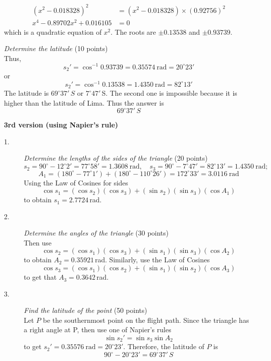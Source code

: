 \begin{description}
\begin{align*}
  (x^2 - 0.018328)^2 &= (x^2 - 0.018328) \times (0.92756)^2\\
  x^4 - 0.89702x^2 + 0.016105 &= 0
  \end{align*}
  which is a quadratic equation of $x^2$. The roots are $\pm 0.13538$ and
  $\pm 0.93739$.
\item[5.] \emph{Determine the latitude} \hfill(10 points)\\
  Thus,
  \[ s_2' = \cos^{-1} 0.93739 = 0.35574\ \mathrm{rad} = 20^\circ 23' \]
  or
  \[ s_2' = \cos^{-1} 0.13538 = 1.4350\ \mathrm{rad} = 82^\circ 13' \]
  The latitude is $69^\circ 37'\,S$ or $7^\circ 47'$\,S. The second one is
  impossible because it is higher than the latitude of Lima. Thus the answer
  is
  \[ 69^\circ 37'\,S \]
\end{description}

\textbf{3rd version (using Napier's rule)}

\begin{description}
\item[1.] \emph{Determine the lengths of the sides of the triangle}
  \hfill(20 points)\\
  \[ s_2 = 90^\circ - 12^\circ 2' = 77^\circ 58' = 1.3608\ \mathrm{rad},\quad
     s_3 = 90^\circ - 7^\circ 47' = 82^\circ 13' = 1.4350\ \mathrm{rad}; \]
  \[ A_1 = (180^\circ - 77^\circ 1') + (180^\circ - 110^\circ 26')
     = 172^\circ 33' = 3.0116\ \mathrm{rad} \]
  Using the Law of Cosines for sides
  \[ \cos s_1 = (\cos s_2)(\cos s_3) + (\sin s_2)(\sin s_3)(\cos A_1) \]
  to obtain $s_1 = 2.7724$\,rad.
\item[2.] \emph{Determine the angles of the triangle} \hfill(30 points)\\
  Then use
  \[ \cos s_2 = (\cos s_1)(\cos s_3) + (\sin s_1)(\sin s_3)(\cos A_2) \]
  to obtain $A_2 = 0.35921$\,rad. Similarly, use the Law of Cosines
  \[ \cos s_3 = (\cos s_1)(\cos s_2) + (\sin s_1)(\sin s_2)(\cos A_3) \]
  to get that $A_3 = 0.3642$\,rad.
\item[3.] \emph{Find the latitude of the point} \hfill(50 points)\\
  Let $P$ be the southernmost point on the flight path. Since the triangle
  has a right angle at P, then use one of Napier's rules
  \[ \sin s_2' = \sin s_3 \sin A_2 \]
  to get $s_2' = 0.35576\ \mathrm{rad} = 20^\circ 23'$. Therefore, the
  latitude of $P$ is
  \[ 90^\circ - 20^\circ 23' = 69^\circ 37'\,S \]
\end{description}
